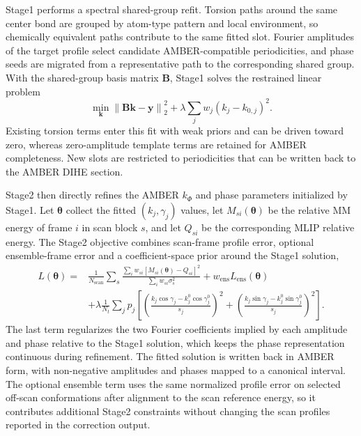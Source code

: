 Stage1 performs a spectral shared-group refit. Torsion paths around the same center bond are grouped by atom-type pattern and local environment, so chemically equivalent paths contribute to the same fitted slot. Fourier amplitudes of the target profile select candidate AMBER-compatible periodicities, and phase seeds are migrated from a representative path to the corresponding shared group. With the shared-group basis matrix $\mathbf{B}$, Stage1 solves the restrained linear problem
\begin{equation}
\min_{\mathbf{k}}
\left\|
\mathbf{B}\mathbf{k}-\mathbf{y}
\right\|_2^2
+ \lambda
\sum_j
w_j\left(k_j-k_{0,j}\right)^2 .
\end{equation}
Existing torsion terms enter this fit with weak priors and can be driven toward zero, whereas zero-amplitude template terms are retained for AMBER completeness. New slots are restricted to periodicities that can be written back to the AMBER DIHE section.

Stage2 then directly refines the AMBER $k_{\Phi}$ and phase parameters initialized by Stage1. Let $\boldsymbol{\theta}$ collect the fitted $(k_j,\gamma_j)$ values, let $M_{si}(\boldsymbol{\theta})$ be the relative MM energy of frame $i$ in scan block $s$, and let $Q_{si}$ be the corresponding MLIP relative energy. The Stage2 objective combines scan-frame profile error, optional ensemble-frame error and a coefficient-space prior around the Stage1 solution,
\begin{equation}
\begin{aligned}
L(\boldsymbol{\theta})
=&
\frac{1}{N_{\mathrm{scan}}}
\sum_s
\frac{
\sum_i w_{si}
\left[
M_{si}(\boldsymbol{\theta})-Q_{si}
\right]^2
}{
\sum_i w_{si}\sigma_s^2
}
+w_{\mathrm{ens}}L_{\mathrm{ens}}(\boldsymbol{\theta}) \\
&+
\lambda
\frac{1}{N_t}
\sum_j
p_j
\left[
\left(
\frac{
k_j\cos\gamma_j-k_j^0\cos\gamma_j^0
}{s_j}
\right)^2
+
\left(
\frac{
k_j\sin\gamma_j-k_j^0\sin\gamma_j^0
}{s_j}
\right)^2
\right].
\end{aligned}
\end{equation}
The last term regularizes the two Fourier coefficients implied by each amplitude and phase relative to the Stage1 solution, which keeps the phase representation continuous during refinement. The fitted solution is written back in AMBER form, with non-negative amplitudes and phases mapped to a canonical interval. The optional ensemble term uses the same normalized profile error on selected off-scan conformations after alignment to the scan reference energy, so it contributes additional Stage2 constraints without changing the scan profiles reported in the correction output.
